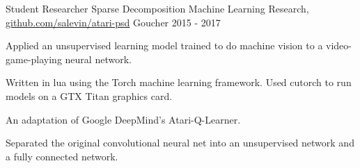 

\begin{cventries}

  \cventry
    {Student Researcher} %
    {Sparse Decomposition Machine Learning Research{\normalfont, \href{https://github.com/salevin/atari-psd}{github.com/salevin/atari-psd}}} %
    {Goucher} %
    {2015 - 2017} %
    {
      \begin{cvitems} %
        \item {Applied an unsupervised learning model trained to do machine vision to a video-game-playing neural network.}
        \item {Written in lua using the Torch machine learning framework. Used cutorch to run models on a GTX Titan graphics card.}
        \item {An adaptation of Google DeepMind's Atari-Q-Learner}.
        \item {Separated the original convolutional neural net into an unsupervised network and a fully connected network.}
      \end{cvitems}
    }


\end{cventries}
